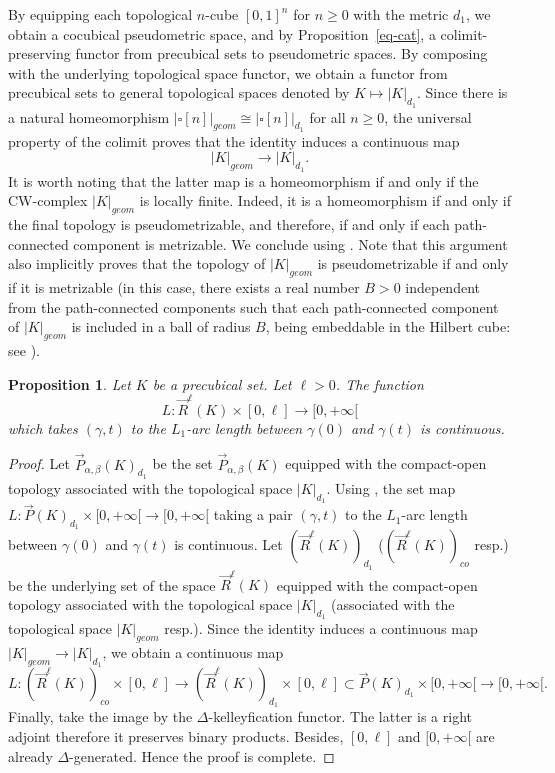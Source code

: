 \documentclass[a4paper,12pt]{amsart}
\newcommand{\p}{\times}
\renewcommand{\vec}{\overrightarrow}
\newtheorem{prop}[thm]{Proposition}
\newcommand{\bp}{\begin{prop}}
\newcommand{\ep}{\end{prop}}
\newcommand{\bpf}{\begin{proof}}
\newcommand{\epf}{\end{proof}}
\theoremstyle{definition}
\newcommand{\iso}{\cong}
\renewcommand{\geq}{\geqslant}
\begin{document}
By equipping each topological $n$-cube $[0,1]^n$ for $n\geq 0$ with the metric $d_1$, we obtain a cocubical pseudometric space, and by Proposition~\ref{eq-cat}, a colimit-preserving functor from precubical sets to pseudometric spaces. By composing with the underlying topological space functor, we obtain a functor from precubical sets to general topological spaces denoted by $K\mapsto |K|_{d_1}$. Since there is a natural homeomorphism $|\square[n]|_{geom} \iso |\square[n]|_{d_1}$ for all $n\geq 0$, the universal property of the colimit proves that the identity induces a continuous map \[|K|_{geom} \longrightarrow |K|_{d_1}.\] It is worth noting that the latter map is a homeomorphism if and only if the CW-complex $|K|_{geom}$ is locally finite. Indeed, it is a homeomorphism if and only if the final topology is pseudometrizable, and therefore, if and only if each path-connected component is metrizable. We conclude using \cite[Proposition~1.5.17]{MR1074175}. Note that this argument also implicitly proves that the topology of $|K|_{geom}$ is pseudometrizable if and only if it is metrizable (in this case, there exists a real number $B>0$ independent from the path-connected components such that each path-connected component of $|K|_{geom}$ is included in a ball of radius $B$, being embeddable in the Hilbert cube: see \cite[Proposition~1.5.12, Proposition~1.5.13 and Theorem~1.5.16]{MR1074175}).


\bp \label{cont}
Let $K$ be a precubical set. Let $\ell >0$. The function \[L:\vec{R}^\ell(K) \p [0,\ell] \longrightarrow [0,+\infty[\] which takes $(\gamma,t)$ to the $L_1$-arc length between $\gamma(0)$ and $\gamma(t)$ is continuous.
\ep


\bpf
Let $\vec{P}_{\alpha,\beta}(K)_{d_1}$ be the set $\vec{P}_{\alpha,\beta}(K)$ equipped with the compact-open topology associated with the topological space $|K|_{d_1}$. Using \cite[Lemma~2.13]{MR2521708}, the set map $L:\vec{P}(K)_{d_1} \p [0,+\infty[ \longrightarrow [0,+\infty[$ taking a pair $(\gamma,t)$ to the $L_1$-arc length between $\gamma(0)$ and $\gamma(t)$ is continuous. Let $(\vec{R}^\ell(K))_{d_1}$ ($(\vec{R}^\ell(K))_{co}$ resp.) be the underlying set of the space $\vec{R}^\ell(K)$ equipped with the compact-open topology associated with the topological space $|K|_{d_1}$ (associated with the topological space $|K|_{geom}$ resp.). Since the identity induces a continuous map $|K|_{geom} \to |K|_{d_1}$, we obtain a continuous map 
\[L:(\vec{R}^\ell(K))_{co} \p [0,\ell] \to (\vec{R}^\ell(K))_{d_1} \p [0,\ell] \subset \vec{P}(K)_{d_1} \p [0,+\infty[\to [0,+\infty[.\]
Finally, take the image by the $\Delta$-kelleyfication functor. The latter is a right adjoint therefore it preserves binary products. Besides, $[0,\ell]$ and $[0,+\infty[$ are already $\Delta$-generated. Hence the proof is complete.
\epf 
\end{document}

